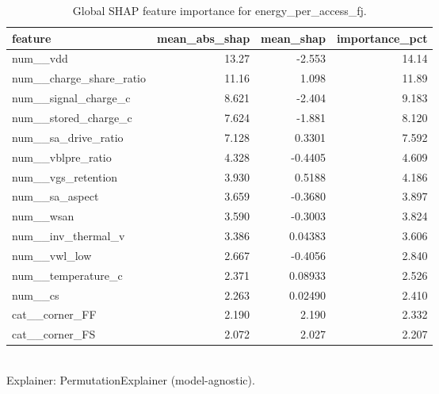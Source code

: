 \begin{table}[!t]
\centering
\caption{Global SHAP feature importance for energy_per_access_fj.}
\label{tab:xai_shap_importance_energy_per_access_fj}
\footnotesize
\begin{tabular}{lrrr}
\toprule
feature & mean\_abs\_shap & mean\_shap & importance\_pct \\
\midrule
num\_\_vdd & 13.27 & -2.553 & 14.14 \\
num\_\_charge\_share\_ratio & 11.16 & 1.098 & 11.89 \\
num\_\_signal\_charge\_c & 8.621 & -2.404 & 9.183 \\
num\_\_stored\_charge\_c & 7.624 & -1.881 & 8.120 \\
num\_\_sa\_drive\_ratio & 7.128 & 0.3301 & 7.592 \\
num\_\_vblpre\_ratio & 4.328 & -0.4405 & 4.609 \\
num\_\_vgs\_retention & 3.930 & 0.5188 & 4.186 \\
num\_\_sa\_aspect & 3.659 & -0.3680 & 3.897 \\
num\_\_wsan & 3.590 & -0.3003 & 3.824 \\
num\_\_inv\_thermal\_v & 3.386 & 0.04383 & 3.606 \\
num\_\_vwl\_low & 2.667 & -0.4056 & 2.840 \\
num\_\_temperature\_c & 2.371 & 0.08933 & 2.526 \\
num\_\_cs & 2.263 & 0.02490 & 2.410 \\
cat\_\_corner\_FF & 2.190 & 2.190 & 2.332 \\
cat\_\_corner\_FS & 2.072 & 2.027 & 2.207 \\
\bottomrule
\end{tabular}
\\[2pt] \footnotesize Explainer: PermutationExplainer (model-agnostic).
\end{table}
